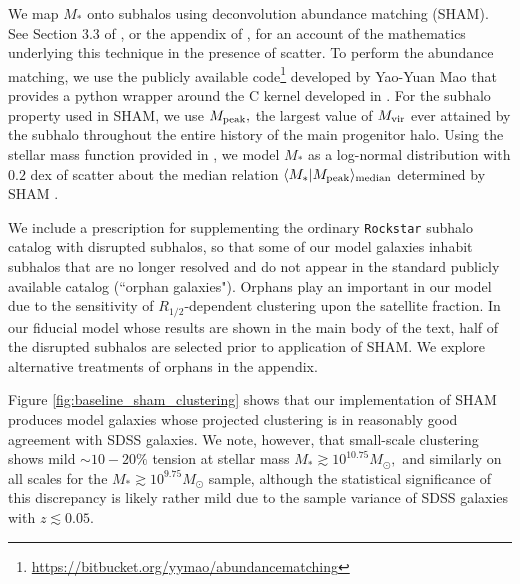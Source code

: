 \documentclass[usenatbib,usegraphicx,letterpaper]{mn2e}
\newcommand{\rhalf}{R_{1/2}}
\newcommand{\mstar}{M_{\ast}}
\newcommand{\mvir}{M_{\rm vir}}
\newcommand{\mpeak}{M_{\rm peak}}
\newcommand{\median}[2]{\langle{#1}\vert{#2}\rangle_{\rm median}}
\newcommand{\msun}{M_\odot}
\begin{document}
We map $\mstar$ onto subhalos using deconvolution abundance matching (SHAM). See Section 3.3 of \citet{behroozi_etal10}, or the appendix of \citet{kravtsov_etal14}, for an account of the mathematics underlying this technique in the presence of scatter. To perform the abundance matching, we use the publicly available code\footnote{\url{https://bitbucket.org/yymao/abundancematching}} developed by Yao-Yuan Mao \citep{lehmann_etal15} that provides a python wrapper around the C kernel developed in \citet{behroozi_etal10}. For the subhalo property used in SHAM, we use $\mpeak,$ the largest value of $\mvir$ ever attained by the subhalo throughout the entire history of the main progenitor halo.  Using the stellar mass function provided in \citet{moustakas_etal13}, we model $\mstar$ as a log-normal distribution with $0.2$ dex of scatter about the median relation $\median{\mstar}{\mpeak}$ determined by SHAM \citep{reddick_etal13}. 

We include a prescription for supplementing the ordinary {\tt Rockstar} subhalo catalog with disrupted subhalos, so that some of our model galaxies inhabit subhalos that are no longer resolved and do not appear in the standard publicly available catalog (``orphan galaxies"). Orphans play an important in our model due to the sensitivity of $\rhalf$-dependent clustering upon the satellite fraction. In our fiducial model whose results are shown in the main body of the text, half of the disrupted subhalos are selected prior to application of SHAM. We explore alternative treatments of orphans in the appendix. 

Figure \ref{fig:baseline_sham_clustering} shows that our implementation of SHAM produces model galaxies whose projected clustering is in reasonably good agreement with SDSS galaxies. We note, however, that small-scale clustering shows mild $\sim10-20\%$ tension at stellar mass $\mstar\gtrsim10^{10.75}\msun,$ and similarly on all scales for the $\mstar\gtrsim10^{9.75}\msun$ sample, although the statistical significance of this discrepancy is likely rather mild due to the sample variance of SDSS galaxies with $z\lesssim0.05.$
\end{document}
